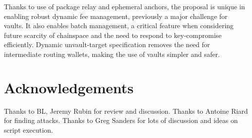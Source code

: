 \documentclass[10pt]{article}
\begin{document}
Thanks to use of package relay and ephemeral anchors, the \opv{} proposal is unique in
enabling robust dynamic fee management, previously a major challenge for vaults. It
also enables batch management, a critical feature when considering future scarcity of
chainspace and the need to respond to key-compromise efficiently. Dynamic
unvault-target specification removes the need for intermediate routing wallets, making
the use of vaults simpler and safer.


\section*{Acknowledgements}

Thanks to BL, Jeremy Rubin for review and discussion. Thanks to Antoine Riard for finding attacks.
Thanks to Greg Sanders for lots of discussion and ideas on script execution.

\printbibliography
\end{document}
